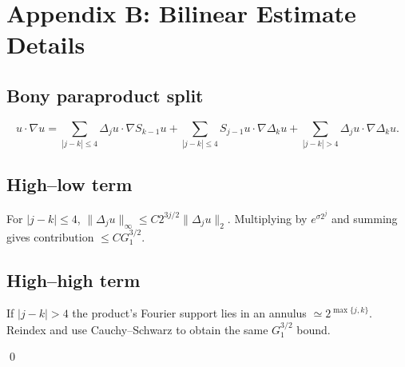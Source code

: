 \section{Appendix B: Bilinear Estimate Details}\label{NS:appendix-bilinear}

\subsection{Bony paraproduct split}
\[
u\!\cdot\!\nabla u
  =\!\!\sum_{|j-k|\le4}\!\!
     \Delta_{j}u\cdot\nabla S_{k-1}u
   +\!\!\sum_{|j-k|\le4}\!\!
     S_{j-1}u\cdot\nabla\Delta_{k}u
   +\!\!\sum_{|j-k|>4}\!\!
     \Delta_{j}u\cdot\nabla\Delta_{k}u.
\]

\subsection{High–low term}
For $|j-k|\le4$,
\(
\|\Delta_{j}u\|_{\infty}\le C 2^{3j/2}\|\Delta_{j}u\|_{2}.
\)
Multiplying by $e^{\sigma 2^{j}}$ and summing gives contribution
\(\le C G_{1}^{3/2}\).

\subsection{High–high term}
If $|j-k|>4$ the product's Fourier support lies in an annulus
$\simeq2^{\max\{j,k\}}$.  Reindex and use Cauchy–Schwarz to obtain the
same $G_{1}^{3/2}$ bound.

\qed 